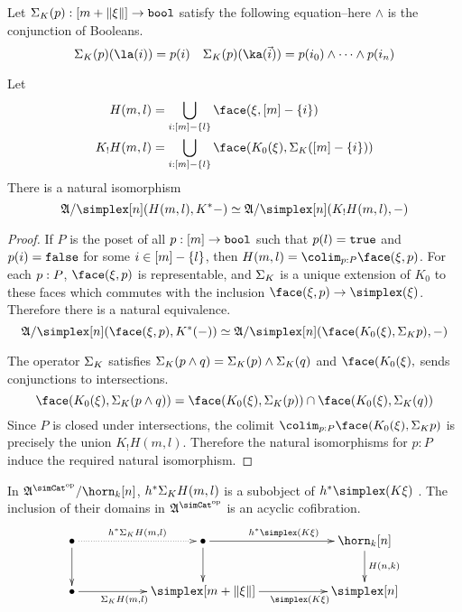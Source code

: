 \documentclass[csh.tex]{subfiles}
\begin{document}

\begin{proposition}
Let $\Sigma_ K(p): [m+\Vert \xi \Vert]\to \mathtt{bool}$ satisfy the following equation--here $\mathord\land$ is the conjunction of Booleans.
\[ \depsum K(p)(\la(i))=p(i)\quad\depsum K(p)(\ka(\vec i)) = p(i_0)\land\dotsm\land p(i_n) \] 

Let \begin{align*}
H(m,l)&=\bigcup_{i\of [m]-\set l} \face(\xi,[m]-\set i)\\
K_!H(m,l)&=\bigcup_{i\of [m]-\set l} \face(K_0(\xi),\depsum K([m]-\set i))
\end{align*}
There is a natural isomorphism \[ \ambient/\simplex[n](H(m,l),K\ri -) \simeq \ambient/\simplex[n](K_!H(m,l),-) \] \label{K-universal}
\end{proposition}


\begin{proof} If $P$ is the poset of all $p:[m]\to\mathtt{bool}$ such that $p(l)=\mathtt{true}$ and $p(i)=\mathtt{false}$ for some $i\in [m]-\left\{l\right\}$, then $H(m,l) = \colim_{p\of P}\face(\xi,p)$.
For each $p: P$, $\face(\xi,p)$ is representable, and $\Sigma_ K$ is a unique extension of $K_0$ to these faces which commutes with the inclusion $\face(\xi,p)\to\simplex(\xi)$. Therefore there is a natural equivalence.
\[ \ambient/\simplex[n](\face(\xi,p),K\ri(-))\simeq \ambient/\simplex[n](\face(K_0(\xi),\depsum K p),-) \]

The operator $\Sigma_ K$ satisfies $\Sigma_ K(p\land q)=\Sigma_ K(p)\land \Sigma_ K(q)$ and $\face(K_0(\xi),$ sends conjunctions to intersections.
\[ \face(K_0(\xi),\depsum K(p\land q)) = \face(K_0(\xi),\depsum K(p))\cap \face(K_0(\xi),\depsum K(q)) \]
Since $P$ is closed under intersections, the colimit $\colim_{p\of P}\face(K_0(\xi),\depsum K p)$ is precisely the union $K_!H(m,l)$. Therefore the natural isomorphisms for $p:P$ induce the required natural isomorphism.
\end{proof}

\begin{lemma} In $\ambient\s/\horn_k[n]$, $h^* \Sigma_ K H(m,l)$ is a subobject of $h\ri\simplex(K\xi)$ . The inclusion of their domains in $\ambient\s$ is an acyclic cofibration. \label{acyclic cofibrancy} 
\[\xymatrix{
\bullet \ar@{.>}[rr]^{h\ri \depsum K H(m,l)} \ar[d] && \bullet\ar[rr]^{h\ri\simplex(K\xi)}\ar[d] && \horn_k[n]\ar[d]^{H(n,k)}\\
\bullet\ar[rr]_(.4){\depsum K H(m,l)} && \simplex[m+\norm\xi]\ar[rr]_(.6){\simplex(K\xi)} && \simplex[n]
}\]
\end{lemma}
\end{document}
